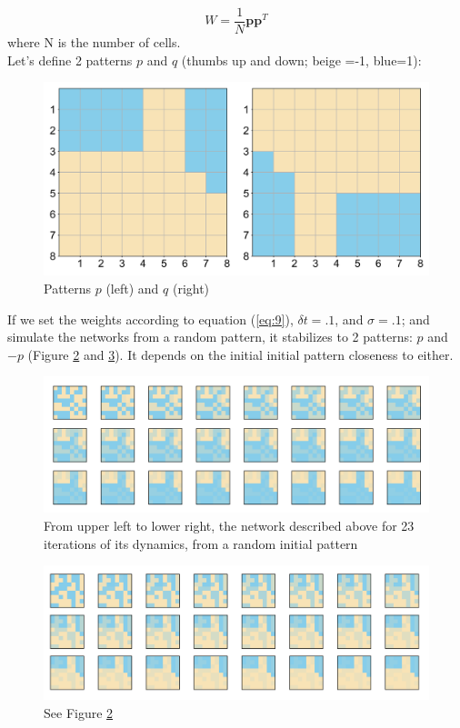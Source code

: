\documentclass{article}
\begin{document}
\begin{equation}\label{eq:9}
  W=\frac{1}{N}\mathbf{p}\mathbf{p}^T
\end{equation}
where N is the number of cells.\\

Let's define 2 patterns $p$ and $q$ (thumbs up and down; beige =-1, blue=1):

\begin{figure}[H]
\centering
\includegraphics[width=.8\linewidth]{exercice5fig9.png}
\caption[spt]{Patterns $p$ (left) and $q$ (right)}\label{fig:fig8}
\end{figure}

If we set the weights according to equation (\ref{eq:9}), $\delta t = .1$, and $\sigma=.1$; and simulate the networks from a random pattern, it stabilizes to 2 patterns: $p$ and $-p$ (Figure \ref{fig:fig9} and \ref{fig:fig10}). It depends on the initial initial pattern closeness to either.

\begin{figure}[H]
\centering
\includegraphics[width=.8\linewidth]{exercice5fig10.png}
\caption[spt]{From upper left to lower right, the network described above for 23 iterations of its dynamics, from a random initial pattern}\label{fig:fig9}
\end{figure}

\begin{figure}[H]
\centering
\includegraphics[width=.8\linewidth]{exercice5fig10.2.png}
\caption[spt]{See Figure \ref{fig:fig9}}\label{fig:fig10}
\end{figure}
\end{document}
